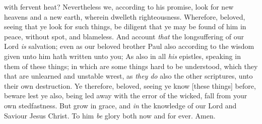 \documentclass[11pt,letterpaper,oneside]{memoir}
\begin{document}
with fervent heat? Nevertheless we, according to his promise, look for
new heavens and a new earth, wherein dwelleth righteousness. Wherefore,
beloved, seeing that ye look for such things, be diligent that ye may be
found of him in peace, without spot, and blameless. And account
\emph{that} the longsuffering of our Lord \emph{is} salvation; even as
our beloved brother Paul also according to the wisdom given unto him
hath written unto you; As also in all \emph{his} epistles, speaking in
them of these things; in which are some things hard to be understood,
which they that are unlearned and unstable wrest, as \emph{they do} also
the other scriptures, unto their own destruction. Ye therefore, beloved,
seeing ye know [these things] before, beware lest ye also, being led
away with the error of the wicked, fall from your own stedfastness. But
grow in grace, and \emph{in} the knowledge of our Lord and Saviour Jesus
Christ. To him \emph{be} glory both now and for ever. Amen.
\end{document}
